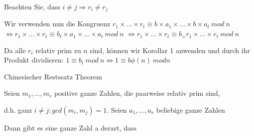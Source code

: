\documentclass[a4paper]{article}
\begin{document}
\begin{multicols}{3}
\begin{itemize*}
\begin{itemize*}
                  \item Beachten Sie, dass $i\not= j \Rightarrow r_i\not= r_j$%
                  \item Wir verwenden nun die Kongruenz $r_1\times ...\times r_t\equiv b\times a_1\times ...\times b\times a_t\ mod\ n$ $\Leftrightarrow r_1\times ...\times r_t\equiv b_t\times a_1\times ...\times a_t\ mod\ n$ $\Leftrightarrow r_1\times ...\times r_t\equiv b_\times r_1\times ...\times r_t\ mod\ n$
                  \item Da alle $r_i$ relativ prim zu $n$ sind, können wir Korollar 1 anwenden und durch ihr Produkt dividieren: $1\equiv b_t\ mod\ n \Leftrightarrow 1\equiv b\phi(n)\ mod n$
            \end{itemize*}
            \item Chinesischer Restssatz Theorem
            \begin{itemize*}
                  \item Seien $m_1,...,m_r$ positive ganze Zahlen, die paarweise relativ prim sind,
                  \item d.h. ganz $i\not= j:gcd(m_i, m_j) = 1$. Seien $a_1,...,a_r$ beliebige ganze Zahlen
                  \item Dann gibt es eine ganze Zahl a derart, dass

\end{itemize*}
\end{itemize*}
\end{multicols}
\end{document}
